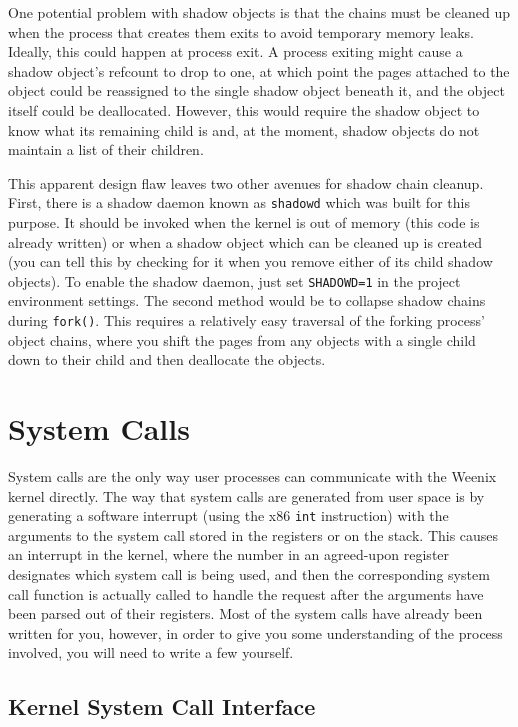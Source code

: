 One potential problem with shadow objects is that the chains must be cleaned up when the process that creates them exits to avoid temporary memory leaks. Ideally, this could happen at process exit. A process exiting might cause a shadow object's refcount to drop to one, at which point the pages attached to the object could be reassigned to the single shadow object beneath it, and the object itself could be deallocated. However, this would require the shadow object to know what its remaining child is and, at the moment, shadow objects do not maintain a list of their children.

This apparent design flaw leaves two other avenues for shadow chain cleanup. First, there is a shadow daemon known as \texttt{shadowd} which was built for this purpose. It should be invoked when the kernel is out of memory (this code is already written) or when a shadow object which can be cleaned up is created (you can tell this by checking for it when you remove either of its child shadow objects). To enable the shadow daemon, just set \texttt{SHADOWD=1} in the project environment settings. The second method would be to collapse shadow chains during \texttt{fork()}. This requires a relatively easy traversal of the forking process' object chains, where you shift the pages from any objects with a single child down to their child and then deallocate the objects.

\section{System Calls}

System calls are the only way user processes can communicate with the Weenix kernel directly. The way that system calls are generated from user space is by generating a software interrupt (using the x86 \texttt{int} instruction) with the arguments to the system call stored in the registers or on the stack. This causes an interrupt in the kernel, where the number in an agreed-upon register designates which system call is being used, and then the corresponding system call function is actually called to handle the request after the arguments have been parsed out of their registers. Most of the system calls have already been written for you, however, in order to give you some understanding of the process involved, you will need to write a few yourself.

\subsection{Kernel System Call Interface}

